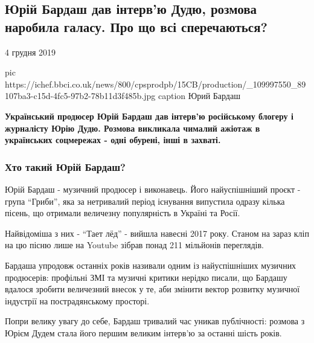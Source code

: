 
 
 
 
 

\subsection{Юрій Бардаш дав інтерв’ю Дудю, розмова наробила галасу. Про що всі сперечаються?}
4 грудня 2019

\ifcmt
pic https://ichef.bbci.co.uk/news/800/cpsprodpb/15CB/production/_109997550_89107ba3-c15d-4fc5-97b2-78b11d3f485b.jpg
caption Юрий Бардаш
\fi

\begin{leftbar}
	\bfseries Український продюсер Юрій Бардаш дав інтерв'ю російському блогеру і
журналісту Юрію Дудю. Розмова викликала чималий ажіотаж в українських
соцмережах - одні обурені, інші в захваті.
\end{leftbar}

\subsubsection{Хто такий Юрій Бардаш?}

Юрій Бардаш - музичний продюсер і виконавець. Його найуспішніший проєкт - група
\enquote{Гриби}, яка за нетривалий період існування випустила одразу кілька пісень, що
отримали величезну популярність в Україні та Росії.

Найвідоміша з них - \enquote{Тает лёд} - вийшла навесні 2017 року. Станом на зараз кліп
на цю пісню лише на Youtube зібрав понад 211 мільйонів переглядів.

Бардаша упродовж останніх років називали одним із найуспішніших музичних
продюсерів: профільні ЗМІ та музичні критики нерідко писали, що Бардашу вдалося
зробити величезний внесок у те, аби змінити вектор розвитку музичної індустрії
на пострадянському просторі.

Попри велику увагу до себе, Бардаш тривалий час уникав публічності: розмова з
Юрієм Дудем стала його першим великим інтерв'ю за останні шість років.

